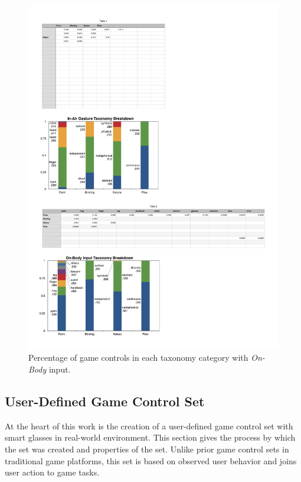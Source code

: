 \documentclass{sigchi}
\begin{document}
 \begin{figure}[!h]
  \centering
  \includegraphics[width=1\columnwidth]{OnbodyTaxonomy.pdf}
  \caption{Percentage of game controls in each taxonomy category with \emph{On-Body} input.}
  \label{fig:OnbodyTaxonomy}
  \end{figure} 

  \subsection{User-Defined Game Control Set}
  At the heart of this work is the creation of a user-defined game control set with smart glasses in real-world environment. This section gives the process by which the set was created and properties of the set. Unlike prior game control sets in traditional game platforms, this set is based on observed user behavior and joins user action to game tasks.
\end{document}
